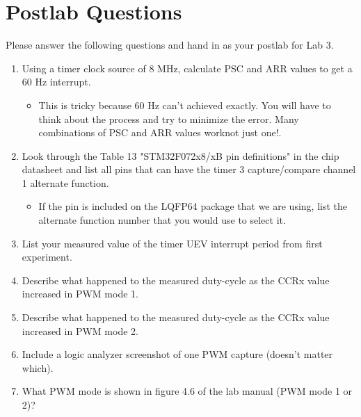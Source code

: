\documentclass[openany,11pt,fleqn]{book} %
\begin{document}
\section{\color{blue}Postlab Questions}
\begin{question}[Postlab 3]
	Please answer the following questions and hand in as your postlab for Lab 3.
	\begin{enumerate}
		\item Using a timer clock source of 8 MHz, calculate PSC and ARR values to get a 60 Hz interrupt.
		\begin{itemize}
			\item This is tricky because 60 Hz can't achieved exactly. You will have to think about the process and try to minimize the error. Many combinations of PSC and ARR values work\textemdash not just one!. 
		\end{itemize}
		\item Look through the Table 13 "STM32F072x8/xB pin definitions" in the chip datasheet and list all pins that can have the timer 3 capture/compare channel 1 alternate function.
		\begin{itemize}
			\item If the pin is included on the LQFP64 package that we are using, list the alternate function number that you would use to select it.
		\end{itemize}
		\item List your measured value of the timer UEV interrupt period from first experiment.
		\item Describe what happened to the measured duty-cycle as the CCRx value increased in PWM mode 1.
		\item Describe what happened to the measured duty-cycle as the CCRx value increased in PWM mode 2.
		\item Include a logic analyzer screenshot of one PWM capture (doesn't matter which). 
		\item What PWM mode is shown in figure 4.6 of the lab manual (PWM mode 1 or 2)?
	\end{enumerate}
\end{question}
\end{document}
